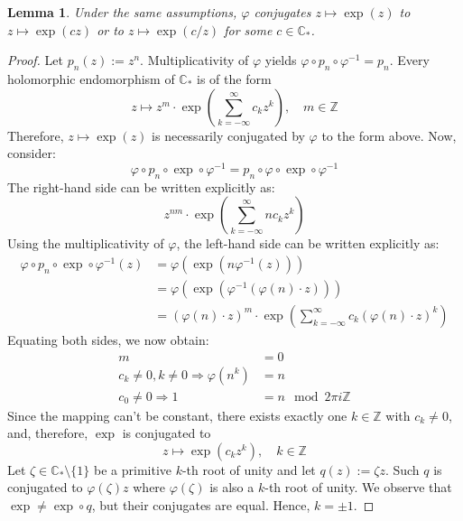 \documentclass[a4paper,12pt]{amsart}
\newcommand{\ZZ}{\mathbb{Z}}
\newcommand{\CC}{\mathbb{C}}
\newtheorem{lemma}[theorem]{Lemma}
\theoremstyle{definition}
\begin{document}
\begin{lemma}
\label{lemma-cstar-exp}
Under the same assumptions, $\varphi$ conjugates $z \mapsto \exp(z)$ to $z \mapsto \exp(c z)$ or to $z \mapsto \exp(c/z)$  for some $c \in \CC_\ast$.
\end{lemma}
\begin{proof}
Let $p_n(z) := z^n$. Multiplicativity of $\varphi$ yields $\varphi \circ p_n \circ \varphi^{-1} = p_n$. 
Every holomorphic endomorphism of $\CC_\ast$ is of the form
\[
z \mapsto z^m \cdot \exp\left(\sum_{k=-\infty}^\infty c_k z^k\right), \quad m \in \ZZ
\]
Therefore, $z \mapsto \exp(z)$ is necessarily conjugated by $\varphi$ to the form above. Now, consider: 
\[
\varphi \circ p_n \circ \exp \circ \varphi^{-1} = p_n \circ \varphi \circ \exp \circ \varphi^{-1}
\]
The right-hand side can be written explicitly as:
\[
z^{nm} \cdot \exp\left(\sum_{k=-\infty}^\infty n c_k z^k\right)
\]
Using the multiplicativity of $\varphi$, the left-hand side can be written explicitly as:
\begin{align*}
\varphi \circ p_n \circ \exp \circ \varphi^{-1}(z)
&= \varphi(\exp(n \varphi^{-1}(z))) \\
&= \varphi(\exp(\varphi^{-1}( \varphi(n) \cdot z))) \\
&= (\varphi(n) \cdot z)^m \cdot \exp\left(\sum_{k=-\infty}^\infty c_k (\varphi(n) \cdot z)^k\right)
\end{align*}
Equating both sides, we now obtain:
\begin{align*}
m &= 0 \\
c_k \neq 0, k \neq 0 \Longrightarrow \varphi(n^k) &= n \\
c_0 \neq 0 \Longrightarrow 1 &= n \mod 2 \pi i \ZZ
\end{align*}
Since the mapping can't be constant, there exists exactly one $k \in \ZZ$ with $c_k \neq 0$, and, therefore, $\exp$ is conjugated to
\[
z \mapsto \exp(c_k z^k), \quad k \in \ZZ
\]
Let $\zeta \in \CC_\ast \setminus \{1\}$ be a primitive $k$-th root of unity and let $q(z) := \zeta z$. Such $q$ is conjugated to $\varphi(\zeta) z$ where $\varphi(\zeta)$ is also a $k$-th root of unity. We observe that $\exp \neq \exp \circ q$, but their conjugates are equal. Hence, $k = \pm 1$.
\end{proof}
\end{document}
